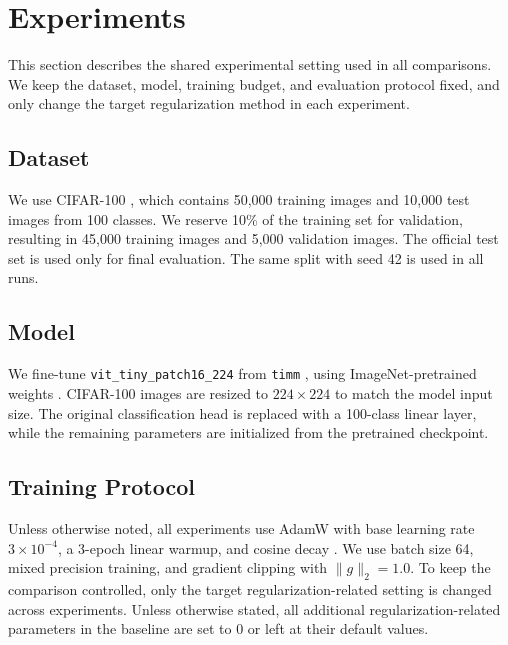 \section{Experiments}
\label{sec:experiments}

This section describes the shared experimental setting used in all
comparisons. We keep the dataset, model, training budget, and evaluation
protocol fixed, and only change the target regularization method in each
experiment.

\subsection{Dataset}
\label{sec:exp:data}
We use CIFAR-100 \citep{krizhevsky2009cifar}, which contains 50,000
training images and 10,000 test images from 100 classes. We reserve
10\% of the training set for validation, resulting in 45,000 training
images and 5,000 validation images. The official test set is used only
for final evaluation. The same split with seed 42 is used in all runs.

\subsection{Model}
\label{sec:exp:model}
We fine-tune \texttt{vit\_tiny\_patch16\_224} from \texttt{timm}
\citep{wightman2019timm}, using ImageNet-pretrained weights
\citep{dosovitskiy2021vit}. CIFAR-100 images are resized to
$224 \times 224$ to match the model input size. The original
classification head is replaced with a 100-class linear layer, while
the remaining parameters are initialized from the pretrained checkpoint.

\subsection{Training Protocol}
\label{sec:exp:training}
Unless otherwise noted, all experiments use AdamW
\citep{loshchilov2019adamw} with base learning rate $3\times10^{-4}$,
a 3-epoch linear warmup, and cosine decay
\citep{loshchilov2017sgdr}. We use batch size 64, mixed precision
training, and gradient clipping with $\lVert g\rVert_2 = 1.0$. To keep
the comparison controlled, only the target regularization-related
setting is changed across experiments. Unless otherwise stated, all additional regularization-related parameters in the baseline are set to 0 or left at their default values.

